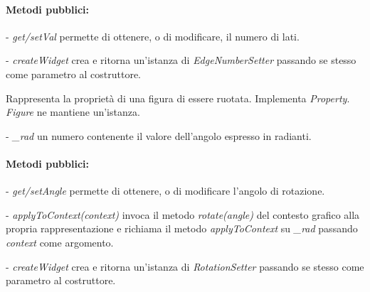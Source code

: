 \paragraph{Metodi pubblici:}
\begin{elencopuntato}[\subsubsecindent]
\item[-] \textit{get/setVal} permette di ottenere, o di modificare, il numero di lati.
\item[-] \textit{createWidget} crea e ritorna un'istanza di \textit{EdgeNumberSetter} passando se stesso come parametro al costruttore.
\end{elencopuntato}

Rappresenta la propriet\`a di una figura di essere ruotata.
Implementa \textit{Property}.
\textit{Figure} ne mantiene un'istanza.
\begin{elencopuntato}[\subsubsecindent]
\item[-] \textit{\_rad} un numero contenente il valore dell'angolo espresso in radianti.
\end{elencopuntato}
\paragraph{Metodi pubblici:}
\begin{elencopuntato}[\subsubsecindent]
\item[-] \textit{get/setAngle} permette di ottenere, o di modificare l'angolo di rotazione.
\item[-] \textit{applyToContext(context)} invoca il metodo \textit{rotate(angle)} del contesto grafico alla propria rappresentazione e richiama il metodo \textit{applyToContext} su \textit{{\_}rad} passando \textit{context} come argomento.
\item[-] \textit{createWidget} crea e ritorna un'istanza di \textit{RotationSetter} passando se stesso come parametro al costruttore.
\end{elencopuntato}

